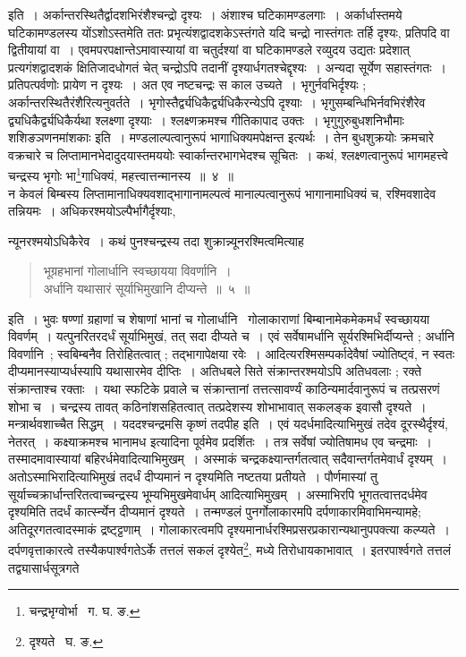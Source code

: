 \documentclass[11pt, openany]{book}
\begin{document}
\indent इति~। अर्कान्तरस्थितैर्द्वादशभिरंशैश्चन्द्रो दृश्यः~। अंशाश्च घटिकामण्डलगाः~। अर्कार्धास्तमये घटिकामण्डलस्य योंऽशोऽस्तमेति ततः प्रभृत्यंशद्वादशकेऽस्तंगते यदि चन्द्रो नास्तंगतः तर्हि दृश्यः, प्रतिपदि वा द्वितीयायां वा~। एवमपरपक्षान्तेऽमावास्यायां वा चतुर्दश्यां वा घटिकामण्डले रव्युदय उद्यतः प्रदेशात् प्रत्यगंशद्वादशकं क्षितिजादधोगतं चेत् चन्द्रोऽपि तदानीं दृश्यार्धगतश्चेद्दृश्यः~। अन्यदा सूर्येण 
सहास्तंगतः~। प्रतिपत्पर्वणोः प्रायेण न दृश्यः~। अत एव नष्टचन्द्रः स काल उच्यते~। भृगुर्नवभिर्दृश्यः ; 
अर्कान्तरस्थितैरंशैरित्यनुवर्तते~। भृगोस्तैर्द्व्यधिकैर्द्व्यधिकैरन्येऽपि दृश्याः~। भृगुसम्बन्धिभिर्नवभिरंशैरेव द्व्यधिकैर्द्व्यधिकैर्यथा श्लक्ष्णा दृश्याः~। श्लक्ष्णक्रमश्च गीतिकापाद उक्तः~। {\qt भृगुगुरुबुधशनिभौमाः शशिङञणनमांशकाः} इति~। मण्डलाल्पत्वानुरूपं भागाधिक्यमपेक्षन्त इत्यर्थः~। तेन बुधशुक्रयोः क्रमचारे वक्रचारे च लिप्तामानभेदादुदयास्तमययोः स्वार्कान्तरभागभेदश्च सूचितः~। कथं, श्लक्ष्णत्वानुरूपं 
भागमहत्त्वे चन्द्रस्य भृगोः भा\renewcommand{\thefootnote}{२}\footnote{चन्द्रभृग्वोर्भा \textendash\ ग. घ. ङ.}गाधिक्यं, महत्त्वात्तन्मानस्य~॥~४~॥\\

\indent न केवलं बिम्बस्य लिप्तामानाधिक्यवशाद्भागानामल्पत्वं मानाल्पत्वानुरूपं भागानामाधिक्यं च, रश्मिवशादेव तन्नियमः~।
अधिकरश्मयोऽल्पैर्भागैर्दृश्याः,

\newpage

\noindent न्यूनरश्मयोऽधिकैरेव~। कथं पुनश्चन्द्रस्य तदा शुक्रान्न्यूनरश्मित्वमित्याह\textendash 
\begin{quote}
{\ab भूग्रहभानां गोलार्धानि स्वच्छायया विवर्णानि~। \\
 अर्धानि यथासारं सूर्याभिमुखानि दीप्यन्ते~॥~५~॥}
\end{quote}

\indent इति~। भुवः षण्णां ग्रहाणां च शेषाणां भानां च गोलार्धानि \textendash\ गोलाकाराणां बिम्बानामेकमेकमर्धं स्वच्छायया विवर्णम्~। यत्पुनरितरदर्धं सूर्याभिमुखं, तत् सदा दीप्यते च~। एवं सर्वेषामर्धानि सूर्यरश्मिभिर्दीप्यन्ते ; अर्धानि विवर्णानि~; 
स्वबिम्बनैव तिरोहितत्वात् ; तद्भागापेक्षया रवेः~। आदित्यरश्मिसम्पर्कादेवैषां ज्योतिष्ट्वं, न स्वतः दीप्यमानस्याप्यर्धस्यापि यथासारमेव दीप्तिः~। अतिधबले सिते संक्रान्तरश्मयोऽपि अतिधवलाः ; रक्ते संक्रान्ताश्च रक्ताः~। 
यथा स्फटिके प्रवाले च संक्रान्तानां तत्तत्सावर्ण्यं काठिन्यमार्दवानुरूपं च तत्प्रसरणं शोभा च~। चन्द्रस्य तावत् 
कठिनांशसहितत्वात् तत्प्रदेशस्य शोभाभावात् सकलङ्क इवासौ दृश्यते~। मन्त्रार्थवशाच्चैत सिद्धम्~। {\qt यददश्चन्द्रमसि 
कृष्णं तदपीह} इति~। एवं यदर्धमादित्याभिमुखं तदेव दूरस्थैर्दृश्यं, नेतरत्~। कक्ष्याक्रमश्च {\qt भानामध} इत्यादिना पूर्वमेव प्रदर्शितः~। तत्र 
सर्वेषां ज्योतिषामध एव चन्द्रमाः~। तस्मादमावास्यायां बहिरर्धमेवादित्याभिमुखम्~। अस्माकं चन्द्रकक्ष्यान्तर्गतत्वात्
सदैवान्तर्गतमेवार्धं दृश्यम्~। अतोऽस्माभिरादित्याभिमुखं तदर्धं दीप्यमानं न दृश्यमिति नष्टतया प्रतीयते~। पौर्णमास्यां तु 
सूर्याच्चक्रार्धान्तरितत्वाच्चन्द्रस्य भूम्यभिमुखमेवार्धम् आदित्याभिमुखम्~। अस्माभिरपि भूगतत्वात्तदर्धमेव दृश्यमिति तदर्धं
कार्त्स्न्येन दीप्यमानं दृश्यते~। तन्मण्डलं पुनर्गोलाकारमपि दर्पणाकारमिवाभिमन्यामहे; अतिदूरगतत्वादस्माकं द्रष्ट्ट्टणाम्~।
गोलाकारत्वमपि दृश्यमानार्धरश्मिप्रसरप्रकारान्यथानुपपक्त्या कल्प्यते~। दर्पणवृत्ताकारत्वे तस्यैकपार्श्वगतेऽर्के तत्तलं 
सकलं दृश्येत\renewcommand{\thefootnote}{१}\footnote{दृश्यते \textendash\ घ. ङ.}, मध्ये तिरोधायकाभावात्~। इतरपार्श्वगते तत्तलं तद्व्यासार्धसूत्रगते 
\end{document}

